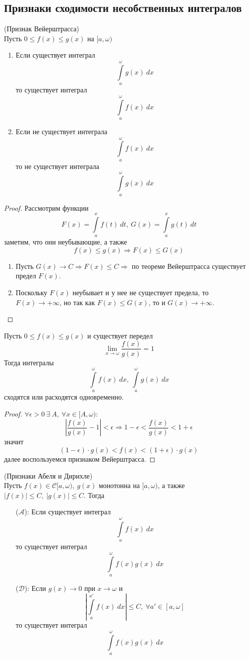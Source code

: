 \subsection{Признаки сходимости несобственных интегралов}
\begin{theorem}
    (Признак Вейерштрасса)\\
    Пусть $0\leq f(x)\leq g(x)$ на $[a,\omega)$
    \begin{enumerate} 
    \item Если существует интеграл
    \[\int\limits_{a}^{\omega}g(x)\ dx\]
    то существует интеграл
    \[\int\limits_{a}^{\omega}f(x)\ dx\]
    \item Если не существует интеграла
    \[\int\limits_{a}^{\omega}f(x)\ dx\]
    то не существует интеграла
    \[\int\limits_{a}^{\omega}g(x)\ dx\]
\end{enumerate}
\end{theorem} 
\begin{proof}
    Рассмотрим функции 
    \[F(x)=\int\limits_{a}^{x}f(t)\ dt,\ G(x)=\int\limits_{a}^{x}g(t)\ dt\]
    заметим, что они неубывающие, а также
    \[f(x)\leq g(x) \Rightarrow F(x)\leq G(x)\]
    \begin{enumerate}
        \item Пусть $G(x)\to C \Rightarrow F(x)\leq C \Rightarrow$ по теореме Вейерштрасса существует предел $F(x)$.
        \item Поскольку $F(x)$ неубывает и у нее не существует предела, то $F(x)\to +\infty$, но так как $F(x)\leq G(x)$, то и $G(x)\to +\infty$.
    \end{enumerate}
\end{proof}
\begin{theorem}
    Пусть $0\leq f(x)\leq g(x)$ и существует передел
    \[\lim\limits_{x\to \omega}\frac{f(x)}{g(x)}=1\]
    Тогда интегралы
    \[\int\limits_{a}^{\omega}f(x)\ dx,\ \int\limits_{a}^{\omega}g(x)\ dx\] 
    сходятся или расходятся одновременно.
\end{theorem} 
\begin{proof}
    $\forall \epsilon>0\ \exists\ A,\ \forall x\in [A, \omega)$:
    \[\left|\frac{f(x)}{g(x)}-1\right|<\epsilon \Rightarrow 1-\epsilon<\frac{f(x)}{g(x)}<1+\epsilon\]
    значит
    \[(1-\epsilon)\cdot g(x)<f(x)<(1+\epsilon)\cdot g(x)\]
    далее воспользуемся признаком Вейерштрасса.
\end{proof} 
\begin{theorem}
    (Признаки Абеля и Дирихле)\\
    Пусть $f(x)\in \mathcal{C}[a,\omega),\ g(x)$ монотонна на $[a,\omega)$, а также $|f(x)|\leq C,\ |g(x)|\leq C$. Тогда 
    \begin{itemize}
        \item[($\mathcal{A}$):] Если существует интеграл 
        \[\int\limits_{a}^{\omega}f(x)\ dx\]
        то существует интеграл
        \[\int\limits_{a}^{\omega}f(x)g(x)\ dx\]
        \item[($\mathcal{D}$):] Если $g(x)\to 0$ при $x\to \omega$ и
        \[\left|\int\limits_{a}^{a'}f(x)\ dx\right|\leq C,\ \forall a'\in [a,\omega]\]
        то существует интеграл
        \[\int\limits_{a}^{\omega}f(x)g(x)\ dx\]
    \end{itemize}
\end{theorem} 
